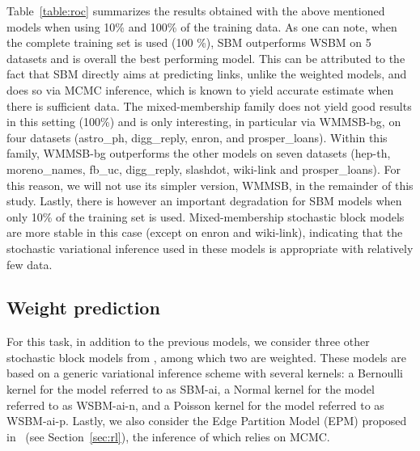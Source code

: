 Table~\ref{table:roc} summarizes the results obtained with the above mentioned models when using 10\% and 100\% of the training data. As one can note, when the complete training set is used (100 \%), SBM outperforms WSBM on 5 datasets and is overall the best performing model. This can be attributed to the fact that SBM directly aims at predicting links, unlike the weighted models, and does so via MCMC inference, which is known to yield accurate estimate when there is sufficient data. The mixed-membership family does not yield good results in this setting (100\%) and is only interesting, in particular via WMMSB-bg, on four datasets (astro\_ph, digg\_reply, enron, and prosper\_loans). Within this family, WMMSB-bg outperforms the other models on seven datasets (hep-th, moreno\_names, fb\_uc, digg\_reply, slashdot, wiki-link and prosper\_loans). For this reason, we will not use its simpler version, WMMSB, in the remainder of this study. Lastly, there is however an important degradation for SBM models when only 10\% of the training set is used. Mixed-membership stochastic block models are more stable in this case (except on enron and wiki-link), indicating that the stochastic variational inference used in these models is appropriate with relatively few data. %

\subsection{Weight prediction}

For this task, in addition to the previous models, we consider three other stochastic block models from \cite{aicher2014learning}, among which two are weighted. These models are based on a generic variational inference scheme with several kernels: a Bernoulli kernel for the model referred to as SBM-ai, a Normal kernel for the model referred to as WSBM-ai-n, and a Poisson kernel for the model referred to as WSBM-ai-p. Lastly, we also consider the Edge Partition Model (EPM) proposed in~\cite{zhou2015} (see Section~\ref{sec:rl}), the inference of which relies on MCMC.

